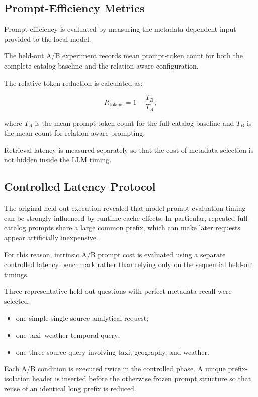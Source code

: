 \subsection{Prompt-Efficiency Metrics}

Prompt efficiency is evaluated by measuring the metadata-dependent input
provided to the local model.

The held-out A/B experiment records mean prompt-token count for both the
complete-catalog baseline and the relation-aware configuration.

The relative token reduction is calculated as:

\[
R_{\mathrm{tokens}}
=
1 -
\frac{T_B}{T_A},
\]

where \(T_A\) is the mean prompt-token count for the full-catalog baseline and
\(T_B\) is the mean count for relation-aware prompting.

Retrieval latency is measured separately so that the cost of metadata
selection is not hidden inside the LLM timing.


\subsection{Controlled Latency Protocol}

The original held-out execution revealed that model prompt-evaluation timing
can be strongly influenced by runtime cache effects. In particular, repeated
full-catalog prompts share a large common prefix, which can make later
requests appear artificially inexpensive.

For this reason, intrinsic A/B prompt cost is evaluated using a separate
controlled latency benchmark rather than relying only on the sequential
held-out timings.

Three representative held-out questions with perfect metadata recall were
selected:

\begin{itemize}

    \item one simple single-source analytical request;

    \item one taxi--weather temporal query;

    \item one three-source query involving taxi, geography, and weather.

\end{itemize}

Each A/B condition is executed twice in the controlled phase. A unique
prefix-isolation header is inserted before the otherwise frozen prompt
structure so that reuse of an identical long prefix is reduced.

